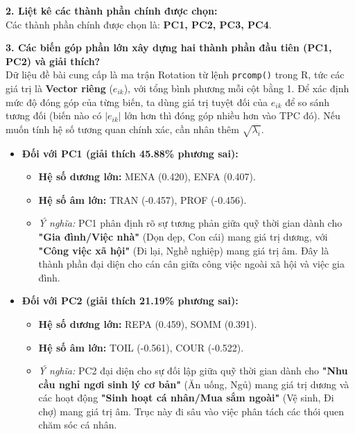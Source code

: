 \documentclass[12pt, a4paper]{article}
\begin{document}
\textbf{2. Liệt kê các thành phần chính được chọn:} 
\\
Các thành phần chính được chọn là: \textbf{PC1, PC2, PC3, PC4}.

\textbf{3. Các biến góp phần lớn xây dựng hai thành phần đầu tiên (PC1, PC2) và giải thích?}
\\
Dữ liệu đề bài cung cấp là ma trận Rotation từ lệnh \texttt{prcomp()} trong R, tức các giá trị là \textbf{Vector riêng} ($e_{ik}$), với tổng bình phương mỗi cột bằng 1. Để xác định mức độ đóng góp của từng biến, ta dùng giá trị tuyệt đối của $e_{ik}$ để so sánh tương đối (biến nào có $|e_{ik}|$ lớn hơn thì đóng góp nhiều hơn vào TPC đó). Nếu muốn tính hệ số tương quan chính xác, cần nhân thêm $\sqrt{\lambda_i}$.

\begin{itemize}
    \item \textbf{Đối với PC1 (giải thích 45.88\% phương sai):}
    \begin{itemize}
        \item \textbf{Hệ số dương lớn:} MENA (0.420), ENFA (0.407).
        \item \textbf{Hệ số âm lớn:} TRAN (-0.457), PROF (-0.456).
        \item \textit{Ý nghĩa:} PC1 phân định rõ sự tương phản giữa quỹ thời gian dành cho \textbf{"Gia đình/Việc nhà"} (Dọn dẹp, Con cái) mang giá trị dương, với \textbf{"Công việc xã hội"} (Đi lại, Nghề nghiệp) mang giá trị âm. Đây là thành phần đại diện cho cán cân giữa công việc ngoài xã hội và việc gia đình.
    \end{itemize}
    \item \textbf{Đối với PC2 (giải thích 21.19\% phương sai):}
    \begin{itemize}
        \item \textbf{Hệ số dương lớn:} REPA (0.459), SOMM (0.391).
        \item \textbf{Hệ số âm lớn:} TOIL (-0.561), COUR (-0.522).
        \item \textit{Ý nghĩa:} PC2 đại diện cho sự đối lập giữa quỹ thời gian dành cho \textbf{"Nhu cầu nghỉ ngơi sinh lý cơ bản"} (Ăn uống, Ngủ) mang giá trị dương và các hoạt động \textbf{"Sinh hoạt cá nhân/Mua sắm ngoài"} (Vệ sinh, Đi chợ) mang giá trị âm. Trục này đi sâu vào việc phân tách các thói quen chăm sóc cá nhân.
    \end{itemize}
\end{itemize}
\end{document}
